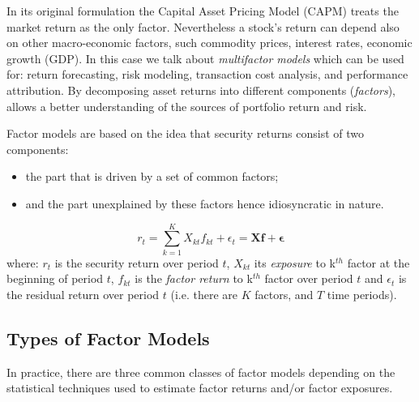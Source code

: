 In its original formulation the Capital Asset Pricing Model (CAPM) treats the market return as the only factor. Nevertheless a stock’s return can depend also on other macro-economic factors, such commodity prices, interest rates, economic growth (GDP). In this case we talk about \emph{multifactor models} which can be used for: return forecasting, risk modeling, transaction cost analysis, and performance attribution.
By decomposing asset returns into different components (\emph{factors}), allows a better understanding of the sources of portfolio return and risk.

Factor models are based on the idea that security returns consist of two components:
\begin{itemize}
\tightlist
\item the part that is driven by a set of common factors;
\item and the part unexplained by these factors hence idiosyncratic in nature.
\end{itemize}
\begin{equation}
r_{t} = \sum_{k=1}^{K} X_{kt} f_{kt} + \epsilon_{t} = \mathbf{Xf} + \boldsymbol{\epsilon}
\label{eq:multifactor}
\end{equation}
where: $r_{t}$ is the security return over period $t$, $X_{kt}$ its \emph{exposure} to k$^{th}$ factor at the beginning of period $t$, $f_{kt}$ is the \emph{factor return} to k$^{th}$ factor over period $t$ and $\epsilon_{t}$ is the residual return over period $t$ (i.e. there are $K$ factors, and $T$ time periods).

\subsection{Types of Factor Models}

In practice, there are three common classes of factor models depending on the statistical techniques used to estimate factor returns and/or factor exposures.

